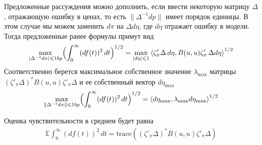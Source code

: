 \documentclass[10pt]{article}
\theoremstyle{definition}
\theoremstyle{remark}
\theoremstyle{plain}
\newcommand{\scalar}[2]{\left<#1,#2\right>}
\begin{document}
Предложенные рассуждения можно дополнить, если ввести некоторую матрицу $\Delta$, отражающую ошибку в ценах, то есть $\|\Delta^{-1}dp\|$ имеет порядок единицы. В этом случае мы можем заменить $d\pi$  на $\Delta d\eta$, где $d\eta$ отражает ошибку в модели. Тогда предложенные ранее формулы примут вид 
\begin{align}
\max\limits_{|\Delta^{-1}d\pi| \leqslant 1bp} 
	\Bigl(\int_0^{\infty}(df(t))^2\,dt\Bigr)^{1/2}
= \max\limits_{|d\eta| \leqslant 1} 
	\scalar{\zeta'_\pi \Delta\, d\eta}{B(u,u)\zeta'_{\pi}\,\Delta d\eta}^{1/2}
\end{align}
Соответственно берется максимальное собственное значение $\lambda_{\max}$ матрицы $(\zeta'_{\pi}\Delta)^*B(u,u)\zeta'_{\pi}\Delta$ и ее собственный вектор $d\eta_{\max}$
\begin{align}
\max\limits_{\|\Delta^{-1} d\pi\| \leqslant 1bp} \Bigl(\int_0^{\infty}(df(t))^2\,dt\Bigr)^{1/2}
= \scalar{d\eta_{\max}}{\lambda_{\max}d\eta_{\max}}^{1/2}
\end{align}

Оценка чувствительности в среднем будет равна
\begin{align*}
\mathbb{E}\int_0^{\infty}(df(t))^2\,dt = \mathrm{trace}\left((\zeta'_{\pi}\Delta)^* B(u,u) \zeta'_{\pi}\Delta\right) 
\end{align*}
\end{document}
